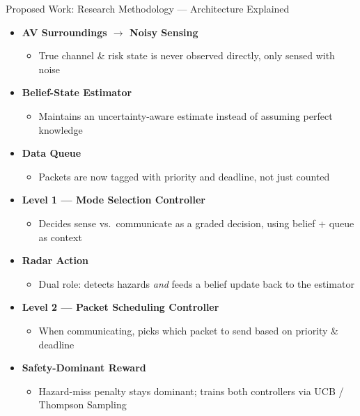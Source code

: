 \documentclass[aspectratio=169]{beamer}
\begin{document}
\begin{frame}{Proposed Work: Research Methodology --- Architecture Explained}
  \footnotesize
  \begin{itemize}
    \setlength{\itemsep}{0.06cm}
    \item \textbf{AV Surroundings $\to$ Noisy Sensing}
      \begin{itemize}
        \small \item[--] True channel \& risk state is never observed directly, only sensed with noise
      \end{itemize}
    \item \textbf{Belief-State Estimator}
      \begin{itemize}
        \small \item[--] Maintains an uncertainty-aware estimate instead of assuming perfect knowledge
      \end{itemize}
    \item \textbf{Data Queue}
      \begin{itemize}
        \small \item[--] Packets are now tagged with priority and deadline, not just counted
      \end{itemize}
    \item \textbf{Level 1 --- Mode Selection Controller}
      \begin{itemize}
        \small \item[--] Decides sense vs.\ communicate as a graded decision, using belief + queue as context
      \end{itemize}
    \item \textbf{Radar Action}
      \begin{itemize}
        \small \item[--] Dual role: detects hazards \emph{and} feeds a belief update back to the estimator
      \end{itemize}
    \item \textbf{Level 2 --- Packet Scheduling Controller}
      \begin{itemize}
        \small \item[--] When communicating, picks which packet to send based on priority \& deadline
      \end{itemize}
    \item \textbf{Safety-Dominant Reward}
      \begin{itemize}
        \small \item[--] Hazard-miss penalty stays dominant; trains both controllers via UCB / Thompson Sampling
      \end{itemize}
  \end{itemize}
\end{frame}
\end{document}
